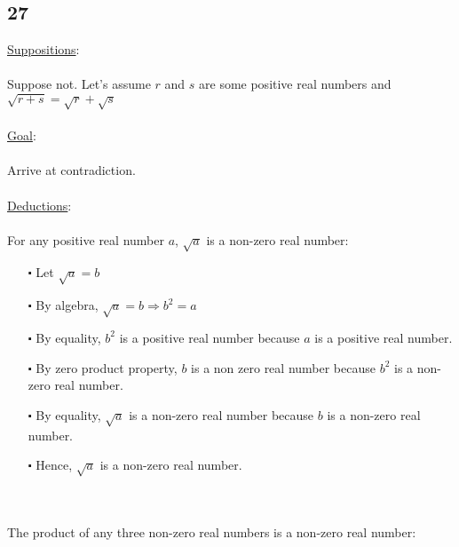 \documentclass[12pt]{article}
\begin{document}
\subsection*{27}
\underline{Suppositions}:
\\ \\
Suppose not. Let's assume $r$ and $s$ are some positive real numbers and $\sqrt{r+s} = \sqrt{r} + \sqrt{s}$
\\ \\
\underline{Goal}:
\\ \\
Arrive at contradiction.
\\ \\
\underline{Deductions}:
\\ \\
For any positive real number $a$, $\sqrt{a}$ is a non-zero real number:
\begin{itemize}
  \item [$\centerdot$] Let $\sqrt{a} = b$
  \item [$\centerdot$] By algebra, $\sqrt{a} = b \Rightarrow b^2 = a$
  \item [$\centerdot$] By equality, $b^2$ is a positive real number because $a$ is a positive real number.
  \item [$\centerdot$] By zero product property, $b$ is a non zero real number because $b^2$ is a non-zero real number.
  \item [$\centerdot$] By equality, $\sqrt{a}$ is a non-zero real number because $b$ is a non-zero real number.
  \item [$\centerdot$] Hence, $\sqrt{a}$ is a non-zero real number.
\end{itemize}
\newblock
\\ \\
The product of any three non-zero real numbers is a non-zero real number:
\end{document}
